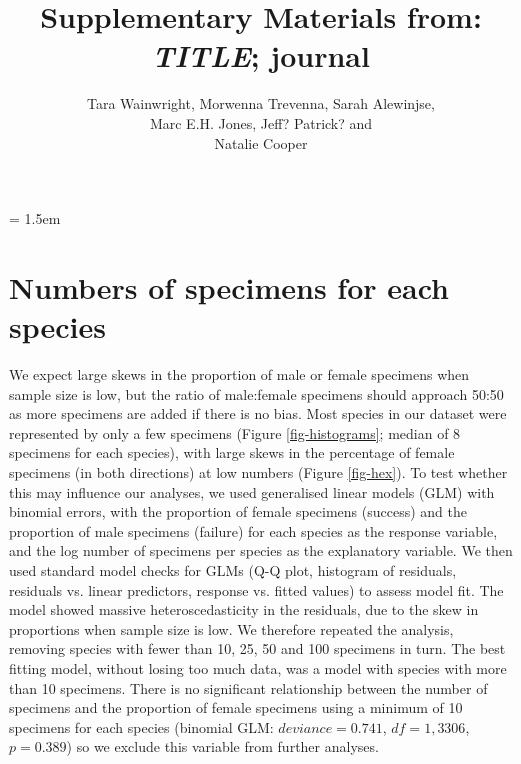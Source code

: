\documentclass[a4paper, 12pt]{article}
\title{Supplementary Materials from: \textit{TITLE}; journal}
\author{Tara Wainwright, 
  Morwenna Trevenna, 
  Sarah Alewinjse,\\ 
  Marc E.H. Jones, 
  Jeff? 
  Patrick? and\\
  Natalie Cooper}
\date{}
\begin{document}
\maketitle

\tableofcontents

\parindent = 1.5em
\addtolength{\parskip}{.3em}

\newpage
\section{Numbers of specimens for each species}
We expect large skews in the proportion of male or female specimens when sample size is low, but the ratio of male:female specimens should approach 50:50 as more specimens are added if there is no bias. 
Most species in our dataset were represented by only a few specimens (Figure \ref{fig-histograms}; median of 8 specimens for each species), with large skews in the percentage of female specimens (in both directions) at low numbers (Figure \ref{fig-hex}).
To test whether this may influence our analyses, we used generalised linear models (GLM) with binomial errors, with the proportion of female specimens (success) and the proportion of male specimens (failure) for each species as the response variable, and the log number of specimens per species as the explanatory variable. 
We then used standard model checks for GLMs (Q-Q plot, histogram of residuals, residuals vs. linear predictors, response vs. fitted values) to assess model fit. 
The model showed massive heteroscedasticity in the residuals, due to the skew in proportions when sample size is low. 
We therefore repeated the analysis, removing species with fewer than 10, 25, 50 and 100 specimens in turn. 
The best fitting model, without losing too much data, was a model with species with more than 10 specimens. 
There is no significant relationship between the number of specimens and the proportion of female specimens using a minimum of 10 specimens for each species (binomial GLM: $deviance = 0.741$, $df = 1,3306$, $p = 0.389$) so we exclude this variable from further analyses.
\end{document}
